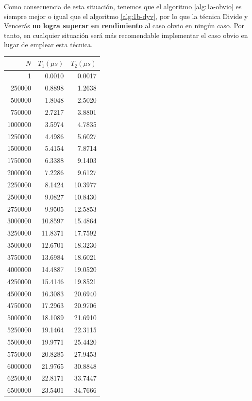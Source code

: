 Como consecuencia de esta situación, tenemos que el algoritmo \ref{alg:1a-obvio} es siempre mejor o igual 
que el algoritmo \ref{alg:1b-dyv}, por lo que la técnica Divide y Vencerás \textbf{no logra superar en 
rendimiento} al caso obvio en ningún caso. Por tanto, en cualquier situación será más recomendable
implementar el caso obvio en lugar de emplear esta técnica. 

\begin{table}
	\footnotesize
	\centering
	\begin{tabular}{|r|r|r|}
        \hline
        $N$ & $T_1 (\mu s)$ & $T_2 (\mu s)$ \\
        \hline
		1 & 0.0010 & 0.0017 \\ 
		250000 & 0.8898 & 1.2638 \\ 
		500000 & 1.8048 & 2.5020 \\ 
		750000 & 2.7217 & 3.8801 \\ 
		1000000 & 3.5974 & 4.7835 \\ 
		1250000 & 4.4986 & 5.6027 \\ 
		1500000 & 5.4154 & 7.8714 \\ 
		1750000 & 6.3388 & 9.1403 \\ 
		2000000 & 7.2286 & 9.6127 \\ 
		2250000 & 8.1424 & 10.3977 \\ 
		2500000 & 9.0827 & 10.8430 \\ 
		2750000 & 9.9505 & 12.5853 \\ 
		3000000 & 10.8597 & 15.4864 \\ 
		3250000 & 11.8371 & 17.7592 \\ 
		3500000 & 12.6701 & 18.3230 \\ 
		3750000 & 13.6984 & 18.6021 \\ 
		4000000 & 14.4887 & 19.0520 \\ 
		4250000 & 15.4146 & 19.8521 \\ 
		4500000 & 16.3083 & 20.6940 \\ 
		4750000 & 17.2963 & 20.9706 \\ 
		5000000 & 18.1089 & 21.6910 \\ 
		5250000 & 19.1464 & 22.3115 \\ 
		5500000 & 19.9771 & 25.4420 \\ 
		5750000 & 20.8285 & 27.9453 \\ 
		6000000 & 21.9765 & 30.8848 \\ 
		6250000 & 22.8171 & 33.7447 \\ 
		6500000 & 23.5401 & 34.7666 \\ 

\end{tabular}
\end{table}
